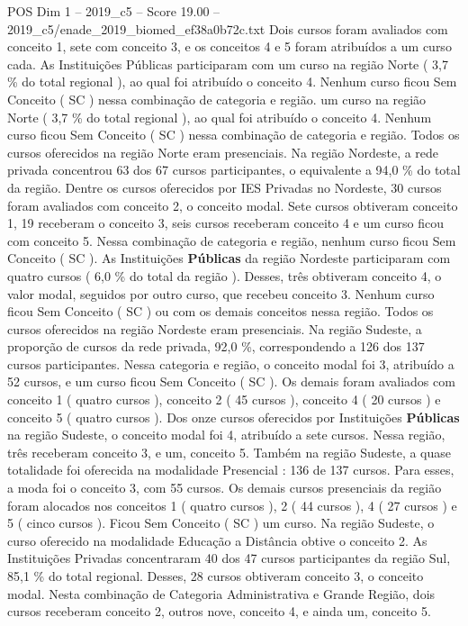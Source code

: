 \begin{textsample}{POS Dim 1 – 2019\_c5 – Score 19.00 – 2019\_c5/enade\_2019\_biomed\_ef38a0b72c.txt}
Dois cursos foram avaliados com conceito 1, sete com conceito 3, e os conceitos 4 e 5 foram atribuídos a um curso cada.
As Instituições Públicas participaram com um curso na região Norte ( 3,7 \% do total regional ), ao qual foi atribuído o conceito 4.
Nenhum curso ficou Sem Conceito ( SC ) nessa combinação de categoria e região. um curso na região Norte ( 3,7 \% do total regional ), ao qual foi atribuído o conceito 4.
Nenhum curso ficou Sem Conceito ( SC ) nessa combinação de categoria e região.
Todos os cursos oferecidos na região Norte eram presenciais.
Na região Nordeste, a rede privada concentrou 63 dos 67 cursos participantes, o equivalente a 94,0 \% do total da região.
Dentre os cursos oferecidos por IES Privadas no Nordeste, 30 cursos foram avaliados com conceito 2, o conceito modal.
Sete cursos obtiveram conceito 1, 19 receberam o conceito 3, seis cursos receberam conceito 4 e um curso ficou com conceito 5.
Nessa combinação de categoria e região, nenhum curso ficou Sem Conceito ( SC ).
As Instituições \textbf{Públicas} da região Nordeste participaram com quatro cursos ( 6,0 \% do total da região ).
Desses, três obtiveram conceito 4, o valor modal, seguidos por outro curso, que recebeu conceito 3.
Nenhum curso ficou Sem Conceito ( SC ) ou com os demais conceitos nessa região.
Todos os cursos oferecidos na região Nordeste eram presenciais.
Na região Sudeste, a proporção de cursos da rede privada, 92,0 \%, correspondendo a 126 dos 137 cursos participantes.
Nessa categoria e região, o conceito modal foi 3, atribuído a 52 cursos, e um curso ficou Sem Conceito ( SC ).
Os demais foram avaliados com conceito 1 ( quatro cursos ), conceito 2 ( 45 cursos ), conceito 4 ( 20 cursos ) e conceito 5 ( quatro cursos ).
Dos onze cursos oferecidos por Instituições \textbf{Públicas} na região Sudeste, o conceito modal foi 4, atribuído a sete cursos.
Nessa região, três receberam conceito 3, e um, conceito 5.
Também na região Sudeste, a quase totalidade foi oferecida na modalidade Presencial : 136 de 137 cursos.
Para esses, a moda foi o conceito 3, com 55 cursos.
Os demais cursos presenciais da região foram alocados nos conceitos 1 ( quatro cursos ), 2 ( 44 cursos ), 4 ( 27 cursos ) e 5 ( cinco cursos ).
Ficou Sem Conceito ( SC ) um curso.
Na região Sudeste, o curso oferecido na modalidade Educação a Distância obtive o conceito 2.
As Instituições Privadas concentraram 40 dos 47 cursos participantes da região Sul, 85,1 \% do total regional.
Desses, 28 cursos obtiveram conceito 3, o conceito modal.
Nesta combinação de Categoria Administrativa e Grande Região, dois cursos receberam conceito 2, outros nove, conceito 4, e ainda um, conceito 5.

\end{textsample}
